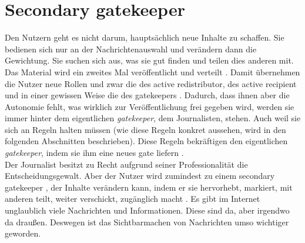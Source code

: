 \section{Secondary gatekeeper} \label{sec:secondary-gate}
Den Nutzern geht es nicht darum, hauptsächlich neue Inhalte zu schaffen. Sie
bedienen sich nur an der Nachrichtenauswahl und verändern dann die Gewichtung.
Sie suchen sich aus, was sie gut finden und teilen dies anderen mit. Das
Material wird ein zweites Mal veröffentlicht und verteilt
\autocite[S.~66]{singer:2014}. Damit übernehmen die Nutzer neue Rollen und zwar
die des \glqq active redistributor\grqq, des \glqq active recipient\grqq\- und in einer gewissen
Weise die des \glqq gatekeepers\grqq\- \autocite[S.~57]{singer:2014}. Dadurch, dass ihnen
aber die Autonomie fehlt, was wirklich zur Veröffentlichung frei gegeben wird,
werden sie immer hinter dem eigentlichen \emph{gatekeeper}, dem Journalisten,
stehen. Auch weil sie sich an Regeln halten müssen (wie diese Regeln konkret
aussehen, wird in den folgenden Abschnitten beschrieben). Diese Regeln
bekräftigen den eigentlichen \emph{gatekeeper}, indem sie ihm eine neues \glqq gate\grqq\-
liefern \autocite[S.~13]{santana:2014}.\\
Der Journalist besitzt zu Recht aufgrund seiner Professionalität die
Entscheidungsgewalt. Aber der Nutzer wird zumindest zu einem \glqq secondary
gatekeeper\grqq\- \autocite[S.~5]{santana:2014}, der Inhalte verändern kann, indem er
sie hervorhebt, markiert, mit anderen teilt, weiter verschickt, zugänglich macht
\autocite[S.~57]{singer:2014}.
Es gibt im Internet unglaublich viele Nachrichten und Informationen. Diese sind
da, aber irgendwo \glqq da draußen\grqq. Deswegen ist das \glqq
Sichtbarmachen\grqq\- von Nachrichten umso wichtiger geworden.

